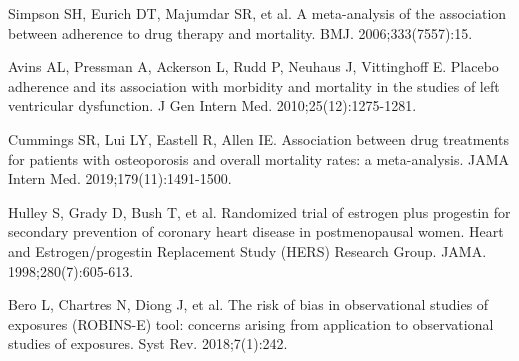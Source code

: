 \begin{references}
\item Simpson SH, Eurich DT, Majumdar SR, et al. A meta-analysis of the association between adherence to drug therapy and mortality. BMJ. 2006;333(7557):15.
\item Avins AL, Pressman A, Ackerson L, Rudd P, Neuhaus J, Vittinghoff E. Placebo adherence and its association with morbidity and mortality in the studies of left ventricular dysfunction. J Gen Intern Med. 2010;25(12):1275-1281.
\item Cummings SR, Lui LY, Eastell R, Allen IE. Association between drug treatments for patients with osteoporosis and overall mortality rates: a meta-analysis. JAMA Intern Med. 2019;179(11):1491-1500.
\item Hulley S, Grady D, Bush T, et al. Randomized trial of estrogen plus progestin for secondary prevention of coronary heart disease in postmenopausal women. Heart and Estrogen/progestin Replacement Study (HERS) Research Group. JAMA. 1998;280(7):605-613.
\item Bero L, Chartres N, Diong J, et al. The risk of bias in observational studies of exposures (ROBINS-E) tool: concerns arising from application to observational studies of exposures. Syst Rev. 2018;7(1):242.
\end{references}
\endgroup
